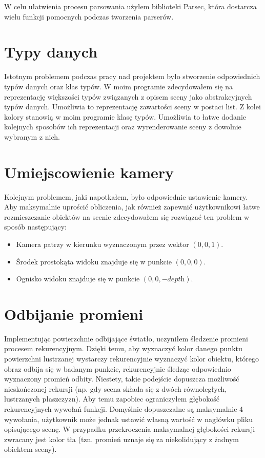 \documentclass[11pt,a4paper]{article}
\begin{document}
W celu ułatwienia procesu parsowania użyłem biblioteki Parsec, która dostarcza wielu funkcji pomocnych podczas tworzenia parserów.
\section{Typy danych}
Istotnym problemem podczas pracy nad projektem było stworzenie odpowiednich typów danych oraz klas typów. W moim programie zdecydowałem się na reprezentację większości typów związanych z opisem sceny jako abstrakcyjnych typów danych. Umożliwia to reprezentację zawartości sceny w postaci list. Z kolei kolory stanowią w moim programie klasę typów. Umożliwia to łatwe dodanie kolejnych sposobów ich reprezentacji oraz wyrenderowanie sceny z dowolnie wybranym z nich.
\section{Umiejscowienie kamery}
Kolejnym problemem, jaki napotkałem, było odpowiednie ustawienie kamery. Aby maksymalnie uprościć obliczenia, jak również zapewnić użytkownikowi łatwe rozmieszczanie obiektów na scenie zdecydowałem się rozwiązać ten problem w sposób następujący:
\begin{itemize}
\item Kamera patrzy w kierunku wyznaczonym przez wektor $(0, 0, 1)$.
\item Środek prostokąta widoku znajduje się w punkcie $(0, 0, 0)$.
\item Ognisko widoku znajduje się w punkcie $(0, 0, -\textit{depth})$.
\end{itemize}
\section{Odbijanie promieni}
Implementując powierzchnie odbijające światło, uczyniłem śledzenie promieni procesem rekurencyjnym. Dzięki temu, aby wyznaczyć kolor danego punktu powierzchni lustrzanej wystarczy rekurencyjnie wyznaczyć kolor obiektu, którego obraz odbija się w badanym punkcie, rekurencyjnie śledząc odpowiednio wyznaczony promień odbity. Niestety, takie podejście dopuszcza możliwość nieskończonej rekursji (np. gdy scena składa się z dwóch równoległych, lustrzanych płaszczyzn). Aby temu zapobiec ograniczyłem głębokość rekurencyjnych wywołań funkcji. Domyślnie dopuszczalne są maksymalnie 4 wywołania, użytkownik może jednak ustawić własną wartość w nagłówku pliku opisującego scenę. W przypadku przekroczenia maksymalnej głębokości rekursji zwracany jest kolor tła (tzn. promień uznaje się za niekolidujący z żadnym obiektem sceny).
\end{document}

